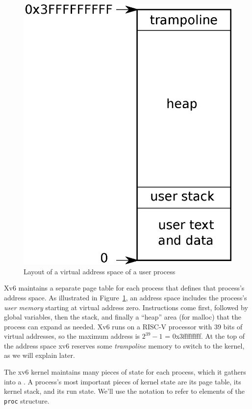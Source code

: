 \begin{figure}[t]
\center
\includegraphics[scale=0.5]{fig/as.eps}
\caption{Layout of a virtual address space of a user process}
\label{fig:as}
\end{figure}

Xv6 maintains a separate page table for each process that defines that process's
address space.  As illustrated in 
Figure~\ref{fig:as},
an address space includes the process's
\textit{user memory}
starting at virtual address zero. Instructions come first,
followed by global variables, then the stack,
and finally a ``heap'' area (for malloc)
that the process can expand as needed.
Xv6 runs on a RISC-V processor with 39 bits of virtual addresses,
so the maximum address is $2^{39}-1$ = 0x3fffffffff.
At the top of the address space xv6 reserves some
\textit{trampoline}
memory to switch to the kernel, as we will explain later.

The xv6 kernel maintains many pieces of state for each process,
which it gathers into a
.
A process's most important pieces of kernel state are its 
page table, its kernel stack, and its run state.
We'll use the notation
to refer to elements of the
\lstinline{proc}
structure.

